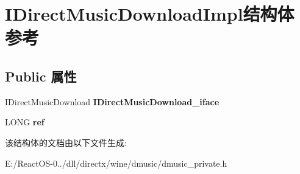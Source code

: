 \hypertarget{struct_i_direct_music_download_impl}{}\section{I\+Direct\+Music\+Download\+Impl结构体 参考}
\label{struct_i_direct_music_download_impl}
\subsection*{Public 属性}
\begin{DoxyCompactItemize}
\item 
\mbox{\label{struct_i_direct_music_download_impl_a6f2d91701264b0f6944e12940fcd9a4c}} 
I\+Direct\+Music\+Download {\bfseries I\+Direct\+Music\+Download\+\_\+iface}
\item 
\mbox{\label{struct_i_direct_music_download_impl_a245b014d4af0fe941dfa686fcc752044}} 
L\+O\+NG {\bfseries ref}
\end{DoxyCompactItemize}


该结构体的文档由以下文件生成\+:\begin{DoxyCompactItemize}
\item 
E\+:/\+React\+O\+S-\/0../dll/directx/wine/dmusic/dmusic\+\_\+private.\+h\end{DoxyCompactItemize}
